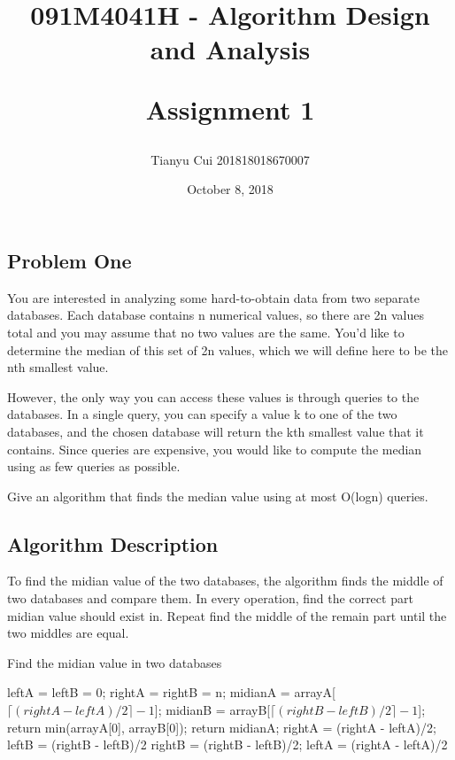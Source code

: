 \documentclass{article}
\begin{document}
\begin{CJK*}{UTF8}{gbsn}

\title{091M4041H - Algorithm Design and Analysis\\ [2ex] \begin{large} Assignment 1 \end{large}}
\author{Tianyu Cui   201818018670007}
\date{October 8, 2018}

\maketitle

\tableofcontents

\newpage
\section{Problem One}

You are interested in analyzing some hard-to-obtain data from two separate databases. Each database contains n numerical values, so there are 2n values total and you may assume that no two values are the same. You'd like to determine the median of this set of 2n values, which we will define here to be the nth smallest value.

However, the only way you can access these values is through queries to the databases. In a single query, you can specify a value k to one of the two databases, and the chosen database will return the kth smallest value that it contains. Since queries are expensive, you would like to compute the median using as few queries as possible.

Give an algorithm that finds the median value using at most O(logn) queries.

\subsection{Algorithm Description}

To find the midian value of the two databases, the algorithm finds the middle of two databases and compare them. In every operation, find the correct part midian value should exist in. Repeat find the middle of the remain part until the two middles are equal.  

\begin{algorithm}[htbp]  
  \caption{Find the midian value in two databases}  
  \begin{algorithmic}[1] 
	\State leftA = leftB = 0;
	\State rightA = rightB = n; 
      \State midianA = arrayA[$\lceil  (rightA - leftA)/2 \rceil -1$];  
      \State midianB = arrayB[$\lceil  (rightB - leftB)/2 \rceil -1$]; 
	 \State return min(arrayA[0], arrayB[0]); 
      \EndIf
	 \State return midianA; 
      \EndIf 
	 \State rightA = (rightA - leftA)/2;
	 \State leftB = (rightB - leftB)/2
	\Else 
	 \State rightB = (rightB - leftB)/2;
	 \State leftA = (rightA - leftA)/2
      \EndIf 
	\EndWhile
    \EndFunction 
  \end{algorithmic}  
\end{algorithm} 


\end{CJK*}
\end{document}
